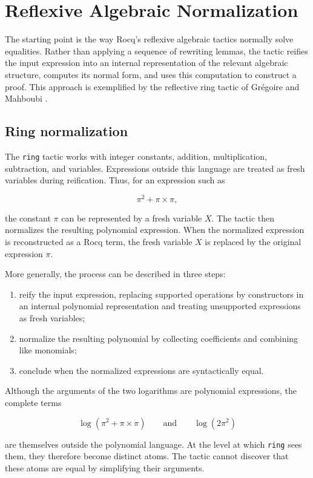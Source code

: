 \documentclass{jflart}
\begin{document}
\section{Reflexive Algebraic Normalization}
The starting point is the way Rocq's reflexive algebraic tactics normally solve
equalities. Rather than applying a sequence of rewriting lemmas, the tactic
reifies the input expression into an internal representation of the relevant
algebraic structure, computes its normal form, and uses this computation to
construct a proof. This approach is exemplified by the reflective ring tactic of Grégoire and Mahboubi \cite{gregoire2005proving}.


\subsection{Ring normalization}

The \texttt{ring} tactic works with integer constants, addition, multiplication, subtraction, and variables. Expressions outside this language are treated as fresh variables during reification. Thus, for an expression such as

$$
  \pi^2+\pi\mathbin{\times}\pi,
$$

the constant $\pi$ can be represented by a fresh variable $X$. The tactic then normalizes the resulting polynomial expression. When the normalized expression is reconstructed as a Rocq term, the fresh variable $X$ is replaced by the original expression $\pi$.

More generally, the process can be described in three steps:
\begin{enumerate}
\item reify the input expression, replacing supported operations by constructors in an internal polynomial representation and treating unsupported expressions as fresh variables;
\item normalize the resulting polynomial by collecting coefficients and combining like monomials;
\item conclude when the normalized expressions are syntactically equal.
\end{enumerate}


Although the arguments of the two logarithms are polynomial expressions, the complete terms

$$
  \log(\pi^2+\pi\mathbin{\times}\pi)
  \qquad\text{and}\qquad
  \log(2\pi^2)
$$

are themselves outside the polynomial language. At the level at which \texttt{ring} sees them, they therefore become distinct atoms. The tactic cannot discover that these atoms are equal by simplifying their arguments.
\end{document}
